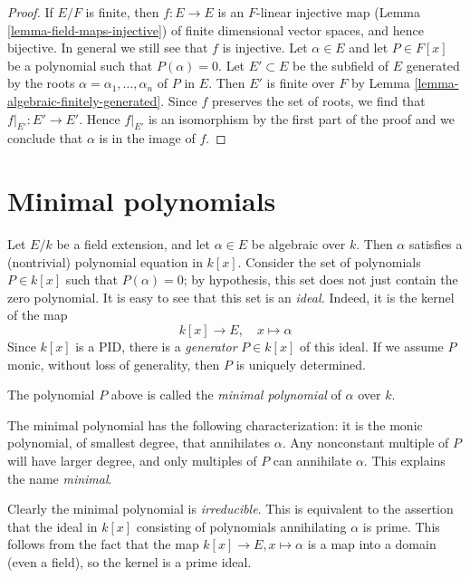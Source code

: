 \begin{proof}
If $E/F$ is finite, then $f : E \to E$ is an $F$-linear
injective map (Lemma \ref{lemma-field-maps-injective})
of finite dimensional vector spaces, and hence bijective.
In general we still see that $f$ is injective.
Let $\alpha \in E$ and let $P \in F[x]$ be a
polynomial such that $P(\alpha) = 0$.
Let $E' \subset E$ be the subfield of $E$ generated
by the roots $\alpha = \alpha_1, \ldots, \alpha_n$ of $P$ in $E$.
Then $E'$ is finite over $F$ by Lemma \ref{lemma-algebraic-finitely-generated}.
Since $f$ preserves the set of roots, we find that
$f|_{E'} : E' \to E'$. Hence $f|_{E'}$ is an isomorphism
by the first part of the proof and we conclude that $\alpha$
is in the image of $f$.
\end{proof}






\section{Minimal polynomials}
\label{section-minimal-polynomials}

\noindent
Let $E/k$ be a field extension, and let $\alpha \in E$ be algebraic over $k$.
Then $\alpha$ satisfies a (nontrivial) polynomial equation in $k[x]$.
Consider the set of polynomials $P \in k[x]$ such that $P(\alpha) = 0$; by
hypothesis, this set does not just contain the zero polynomial.
It is easy to see that this set is an {\it ideal.} Indeed, it is the kernel
of the map
$$
k[x] \to E, \quad x \mapsto \alpha
$$
Since $k[x]$ is a PID, there is a {\it generator} $P \in k[x]$ of this
ideal. If we assume $P$ monic, without loss of generality, then $P$ is
uniquely determined.

\begin{definition}
\label{definition-minimal-polynomial}
The polynomial $P$ above is called the {\it minimal polynomial}
of $\alpha$ over $k$.
\end{definition}

\noindent
The minimal polynomial has the following characterization: it is the monic
polynomial, of smallest degree, that annihilates $\alpha$. Any nonconstant
multiple of $P$ will have larger degree, and only multiples of $P$ can
annihilate $\alpha$. This explains the name {\it minimal}.

\medskip\noindent
Clearly the minimal polynomial is {\it irreducible}. This is equivalent to the
assertion that the ideal in $k[x]$ consisting of polynomials annihilating
$\alpha$ is prime. This follows from the fact that the map
$k[x] \to E, x \mapsto \alpha$ is a map into a domain (even a field), so the
kernel is a prime ideal.

